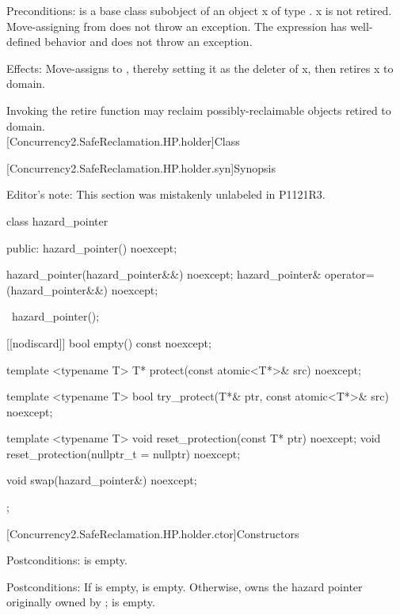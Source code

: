 \pnum
Preconditions:  is a base class subobject of an object x of type . x is not retired.
Move-assigning  from  does not throw an exception. The expression  has well-defined behavior and does not throw an exception.

\pnum
Effects: Move-assigns  to , thereby setting it as the deleter of x, then retires x
to domain.

\pnum
Invoking the retire function may reclaim possibly-reclaimable objects retired to domain.
\\

[Concurrency2.SafeReclamation.HP.holder]{Class }

[Concurrency2.SafeReclamation.HP.holder.syn]{Synopsis}

Editor's note: This section was mistakenly unlabeled in P1121R3.

\begin{codeblock}
class hazard_pointer {
public:
  hazard_pointer() noexcept;

  hazard_pointer(hazard_pointer&&) noexcept;
  hazard_pointer& operator=(hazard_pointer&&) noexcept;

  ~hazard_pointer();
  
  [[nodiscard]] bool empty() const noexcept;
  
  template <typename T>
    T* protect(const atomic<T*>& src) noexcept;
  
  template <typename T>
    bool try_protect(T*& ptr, const atomic<T*>& src) noexcept;
  
  template <typename T>
    void reset_protection(const T* ptr) noexcept;
  void reset_protection(nullptr_t = nullptr) noexcept;
  
  void swap(hazard_pointer&) noexcept;
};
\end{codeblock}

[Concurrency2.SafeReclamation.HP.holder.ctor]{Constructors}


\pnum
Postconditions:  is empty.
\\


\pnum
Postconditions: If  is empty,  is empty. Otherwise,  owns the hazard pointer originally owned by ;  is empty.
\\

